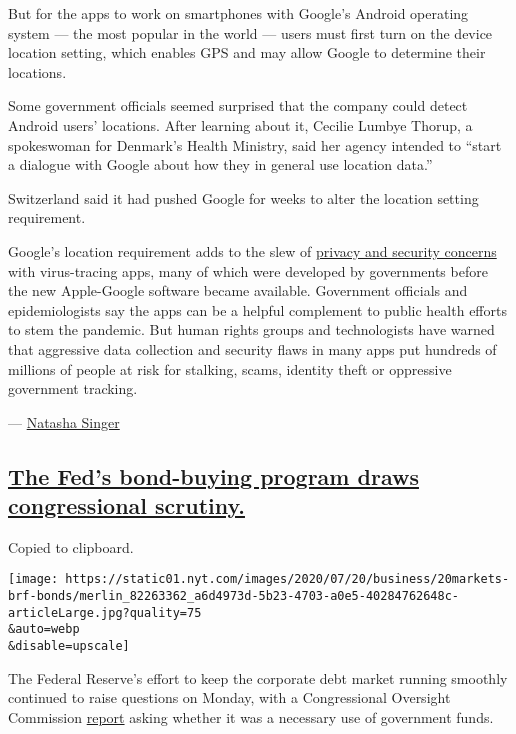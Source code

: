 But for the apps to work on smartphones with Google's Android operating
system --- the most popular in the world --- users must first turn on
the device location setting, which enables GPS and may allow Google to
determine their locations.

Some government officials seemed surprised that the company could detect
Android users' locations. After learning about it, Cecilie Lumbye
Thorup, a spokeswoman for Denmark's Health Ministry, said her agency
intended to ``start a dialogue with Google about how they in general use
location data.''

Switzerland said it had pushed Google for weeks to alter the location
setting requirement.

Google's location requirement adds to the slew of
\href{https://www.nytimes.com/2020/07/08/technology/virus-tracing-apps-privacy.html}{privacy
and security concerns} with virus-tracing apps, many of which were
developed by governments before the new Apple-Google software became
available. Government officials and epidemiologists say the apps can be
a helpful complement to public health efforts to stem the pandemic. But
human rights groups and technologists have warned that aggressive data
collection and security flaws in many apps put hundreds of millions of
people at risk for stalking, scams, identity theft or oppressive
government tracking.

--- \href{https://www.nytimes.com/by/natasha-singer}{Natasha Singer}

\hypertarget{the-feds-bond-buying-program-draws-congressional-scrutiny}{%
\subsection{\texorpdfstring{\protect\hyperlink{the-feds-bond-buying-program-draws-congressional-scrutiny}{The
Fed's bond-buying program draws congressional
scrutiny.}}{The Fed's bond-buying program draws congressional scrutiny.}}\label{the-feds-bond-buying-program-draws-congressional-scrutiny}}

Copied to clipboard.

\texttt{[image: https://static01.nyt.com/images/2020/07/20/business/20markets-brf-bonds/merlin\_82263362\_a6d4973d-5b23-4703-a0e5-40284762648c-articleLarge.jpg?quality=75\\\&auto=webp\\\&disable=upscale]}

The Federal Reserve's effort to keep the corporate debt market running
smoothly continued to raise questions on Monday, with a Congressional
Oversight Commission
\href{https://www.toomey.senate.gov/files/documents/Oversight\%20Commission\%20-\%203rd\%20Report\%20(FINAL)_7.20.20.pdf}{report}
asking whether it was a necessary use of government funds.

